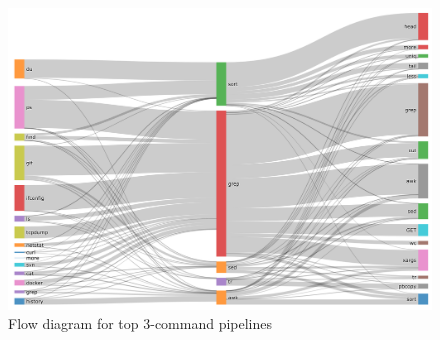 \begin{figure}[h]
	\centering    
	\includegraphics[width=0.9\linewidth]{figures/flow_250.png}
	\caption{Flow diagram for top 3-command pipelines}
	\label{fig:flow}
\end{figure}


%

%

%

%

%

%

